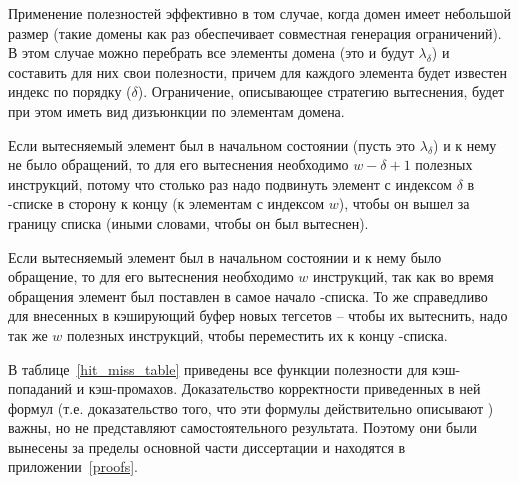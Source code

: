 Применение полезностей эффективно в том случае, когда домен имеет
небольшой размер (такие домены как раз обеспечивает совместная
генерация ограничений). В этом случае можно перебрать все элементы
домена (это и будут $\lambda_\delta$) и составить для них свои
полезности, причем для каждого элемента будет известен индекс по
порядку \LRU ($\delta$). Ограничение, описывающее стратегию
вытеснения, будет при этом иметь вид дизъюнкции по элементам домена.

Если вытесняемый элемент был в начальном состоянии (пусть это
$\lambda_\delta$) и к нему не было обращений, то для его вытеснения
необходимо $w-\delta + 1$ полезных инструкций, потому что столько
раз надо подвинуть элемент с индексом $\delta$ в \LRU-списке в
сторону к концу (к элементам с индексом $w$), чтобы он вышел за
границу списка (иными словами, чтобы он был вытеснен).

Если вытесняемый элемент был в начальном состоянии и к нему было
обращение, то для его вытеснения необходимо $w$ инструкций, так как
во время обращения элемент был поставлен в самое начало \LRU-списка.
То же справедливо для внесенных в кэширующий буфер новых тегсетов --
чтобы их вытеснить, надо так же $w$ полезных инструкций, чтобы
переместить их к концу \LRU-списка.

В таблице~\ref{hit_miss_table} приведены все функции полезности для
кэш-попаданий и кэш-промахов. Доказательство корректности приведенных
 в ней формул (т.е. доказательство того, что эти формулы действительно
 описывают \LRU) важны, но не представляют самостоятельного результата.
Поэтому они были вынесены за пределы основной части диссертации и
находятся в приложении~\ref{proofs}.

